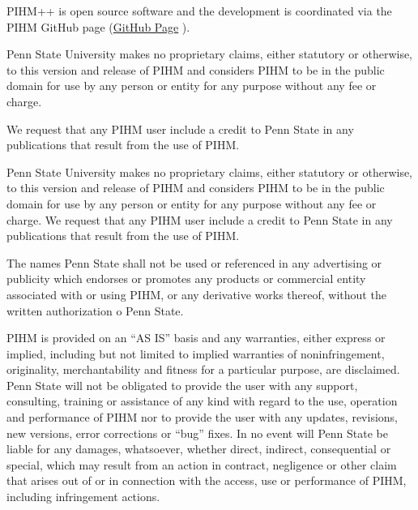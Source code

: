 \documentclass[]{scrbook}
\begin{document}
PIHM++ is open source software and the development is coordinated via
the PIHM GitHub page (\href{https://github.com/shulele/PIHM++}{GitHub
Page} ).

Penn State University makes no proprietary claims, either statutory or
otherwise, to this version and release of PIHM and considers PIHM to be
in the public domain for use by any person or entity for any purpose
without any fee or charge.

We request that any PIHM user include a credit to Penn State in any
publications that result from the use of PIHM.

Penn State University makes no proprietary claims, either statutory or
otherwise, to this version and release of PIHM and considers PIHM to be
in the public domain for use by any person or entity for any purpose
without any fee or charge. We request that any PIHM user include a
credit to Penn State in any publications that result from the use of
PIHM.

The names Penn State shall not be used or referenced in any advertising
or publicity which endorses or promotes any products or commercial
entity associated with or using PIHM, or any derivative works thereof,
without the written authorization o Penn State.

PIHM is provided on an ``AS IS'' basis and any warranties, either
express or implied, including but not limited to implied warranties of
noninfringement, originality, merchantability and fitness for a
particular purpose, are disclaimed. Penn State will not be obligated to
provide the user with any support, consulting, training or assistance of
any kind with regard to the use, operation and performance of PIHM nor
to provide the user with any updates, revisions, new versions, error
corrections or ``bug'' fixes. In no event will Penn State be liable for
any damages, whatsoever, whether direct, indirect, consequential or
special, which may result from an action in contract, negligence or
other claim that arises out of or in connection with the access, use or
performance of PIHM, including infringement actions.


\end{document}
